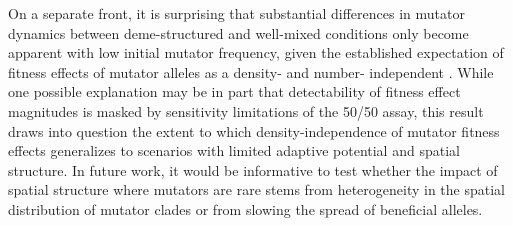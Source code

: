 On a separate front, it is surprising that substantial differences in mutator dynamics between deme-structured and well-mixed conditions only become apparent with low initial mutator frequency, given the established expectation of fitness effects of mutator alleles as a density- and number- independent \citep{raynes2019selection}.
While one possible explanation may be in part that detectability of fitness effect magnitudes is masked by sensitivity limitations of the 50/50 assay, this result draws into question the extent to which density-independence of mutator fitness effects generalizes to scenarios with limited adaptive potential and spatial structure.
In future work, it would be informative to test whether the impact of spatial structure where mutators are rare stems from heterogeneity in the spatial distribution of mutator clades or from slowing the spread of beneficial alleles.
